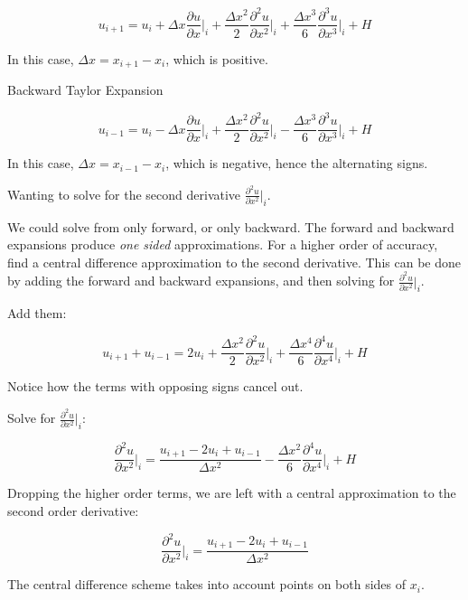 \begin{equation}
u_{i+1} = u_i + \Delta{x}\frac{\partial{u}}{\partial{x}}\bigg|_i + \frac{\Delta{x^2}}{2}\frac{\partial^2{u}}{\partial{x^2}}\bigg|_i + \frac{\Delta{x^3}}{6}\frac{\partial^3{u}}{\partial{x^3}}\bigg|_i + H
\end{equation}

In this case, $\Delta{x} = x_{i+1} - x_i$, which is positive.

Backward Taylor Expansion

\begin{equation}
u_{i-1} = u_i - \Delta{x}\frac{\partial{u}}{\partial{x}}\bigg|_i + \frac{\Delta{x^2}}{2}\frac{\partial^2{u}}{\partial{x^2}}\bigg|_i - \frac{\Delta{x^3}}{6}\frac{\partial^3{u}}{\partial{x^3}}\bigg|_i + H
\end{equation}

In this case, $\Delta{x} = x_{i-1} - x_i$, which is negative, hence the alternating signs.

Wanting to solve for the second derivative $\frac{\partial^2{u}}{\partial{x^2}} \bigg|_i$.

We could solve from only forward, or only backward.
The forward and backward expansions produce \textit{one sided} approximations.
For a higher order of accuracy, find a central difference approximation to the second derivative.
This can be done by adding the forward and backward expansions, and then solving for $\frac{\partial^2{u}}{\partial{x^2}} \bigg|_i$.

Add them:

\begin{equation}
u_{i+1} + u_{i-1} = 2u_i + \frac{\Delta{x^2}}{2}\frac{\partial^2{u}}{\partial{x^2}}\bigg|_i + \frac{\Delta{x^4}}{6}\frac{\partial^4{u}}{\partial{x^4}}\bigg|_i + H
\end{equation}

Notice how the terms with opposing signs cancel out.

Solve for $\frac{\partial^2{u}}{\partial{x^2}} \bigg|_i$:

\begin{equation}
\frac{\partial^2{u}}{\partial{x^2}} \bigg|_i = \frac{u_{i+1} - 2u_i + u_{i-1}}{\Delta{x^2}} - \frac{\Delta{x^2}}{6}\frac{\partial^4{u}}{\partial{x^4}}\bigg|_i + H
\end{equation}

Dropping the higher order terms, we are left with a central approximation to the second order derivative:

\begin{equation}
\frac{\partial^2{u}}{\partial{x^2}} \bigg|_i = \frac{u_{i+1} - 2u_i + u_{i-1}}{\Delta{x^2}}
\end{equation}

The central difference scheme takes into account points on both sides of $x_i$.
